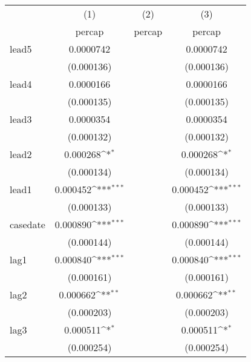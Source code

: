 {
\def\sym#1{\ifmmode^{#1}\else\(^{#1}\)\fi}
\begin{tabular}{l*{3}{c}}
\hline\hline
            &\multicolumn{1}{c}{(1)}&\multicolumn{1}{c}{(2)}&\multicolumn{1}{c}{(3)}\\
            &\multicolumn{1}{c}{percap}&\multicolumn{1}{c}{percap}&\multicolumn{1}{c}{percap}\\
\hline
lead5       &   0.0000742         &                     &   0.0000742         \\
            &  (0.000136)         &                     &  (0.000136)         \\
[1em]
lead4       &   0.0000166         &                     &   0.0000166         \\
            &  (0.000135)         &                     &  (0.000135)         \\
[1em]
lead3       &   0.0000354         &                     &   0.0000354         \\
            &  (0.000132)         &                     &  (0.000132)         \\
[1em]
lead2       &    0.000268\sym{*}  &                     &    0.000268\sym{*}  \\
            &  (0.000134)         &                     &  (0.000134)         \\
[1em]
lead1       &    0.000452\sym{***}&                     &    0.000452\sym{***}\\
            &  (0.000133)         &                     &  (0.000133)         \\
[1em]
casedate    &    0.000890\sym{***}&                     &    0.000890\sym{***}\\
            &  (0.000144)         &                     &  (0.000144)         \\
[1em]
lag1        &    0.000840\sym{***}&                     &    0.000840\sym{***}\\
            &  (0.000161)         &                     &  (0.000161)         \\
[1em]
lag2        &    0.000662\sym{**} &                     &    0.000662\sym{**} \\
            &  (0.000203)         &                     &  (0.000203)         \\
[1em]
lag3        &    0.000511\sym{*}  &                     &    0.000511\sym{*}  \\
            &  (0.000254)         &                     &  (0.000254)         \\

\end{tabular}}
